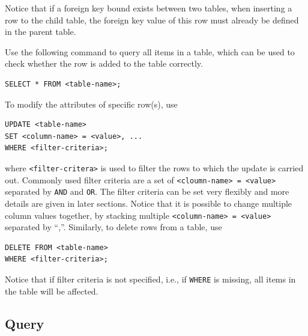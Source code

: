 Notice that if a foreign key bound exists between two tables, when inserting a row to the child table, the foreign key value of this row must already be defined in the parent table.

Use the following command to query all items in a table, which can be used to check whether the row is added to the table correctly.
\begin{lstlisting}
SELECT * FROM <table-name>;
\end{lstlisting}

To modify the attributes of specific row(s), use
\begin{lstlisting}
UPDATE <table-name>
SET <column-name> = <value>, ...
WHERE <filter-criteria>;
\end{lstlisting}
where \verb|<filter-critera>| is used to filter the rows to which the update is carried out. Commonly used filter criteria are a set of \verb|<cloumn-name> = <value>| separated by \verb|AND| and \verb|OR|. The filter criteria can be set very flexibly and more details are given in later sections. Notice that it is possible to change multiple column values together, by stacking multiple \verb|<column-name> = <value>| separated by ``,''. Similarly, to delete rows from a table, use
\begin{lstlisting}
DELETE FROM <table-name>
WHERE <filter-criteria>;
\end{lstlisting}

Notice that if filter criteria is not specified, i.e., if \verb|WHERE| is missing, all items in the table will be affected.

\subsection{Query}

